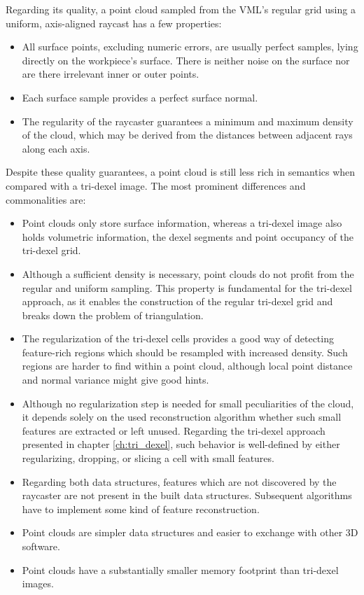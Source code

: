 Regarding its quality, a point cloud sampled from the VML's regular grid using a uniform, axis-aligned raycast has a few properties:
\begin{itemize}
	\item
	All surface points, excluding numeric errors, are usually perfect samples, lying directly on the workpiece's surface.
	There is neither noise on the surface nor are there irrelevant inner or outer points.
	\item
	Each surface sample provides a perfect surface normal.
	\item
	The regularity of the raycaster guarantees a minimum and maximum density of the cloud, which may be derived from the distances between adjacent rays along each axis.
\end{itemize}

Despite these quality guarantees, a point cloud is still less rich in semantics when compared with a tri-dexel image.
The most prominent differences and commonalities are:
\begin{itemize}
	\item
	Point clouds only store surface information, whereas a tri-dexel image also holds volumetric information, \ie the dexel segments and point occupancy of the tri-dexel grid.
	\item
	Although a sufficient density is necessary, point clouds do not profit from the regular and uniform sampling.
	This property is fundamental for the tri-dexel approach, as it enables the construction of the regular tri-dexel grid and breaks down the problem of triangulation.
	\item
	The regularization of the tri-dexel cells provides a good way of detecting feature-rich regions which should be resampled with increased density.
	Such regions are harder to find within a point cloud, although local point distance and normal variance might give good hints.
	\item
	Although no regularization step is needed for small peculiarities of the cloud, it depends solely on the used reconstruction algorithm whether such small features are extracted or left unused.
	Regarding the tri-dexel approach presented in chapter \ref{ch:tri_dexel}, such behavior is well-defined by either regularizing, \ie dropping, or slicing a cell with small features.
	\item
	Regarding both data structures, features which are not discovered by the raycaster are not present in the built data structures.
	Subsequent algorithms have to implement some kind of feature reconstruction.
	\item
	Point clouds are simpler data structures and easier to exchange with other 3D software.
	\item
	Point clouds have a substantially smaller memory footprint than tri-dexel images.
\end{itemize}


